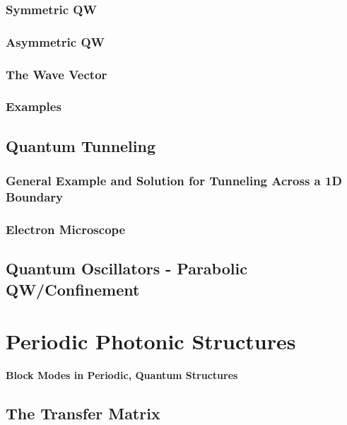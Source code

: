 \documentclass[colorlinks,11pt,a4paper,normalphoto,withhyper,ragged2e]{altareport}
\renewcommand{\ReportSectionFont}{\LARGE\rmfamily\bfseries} %
\begin{document}
		\subsubsection{Symmetric QW}
		
		
		\subsubsection{Asymmetric QW}
		
		
		\subsubsection{The Wave Vector}
		
		
		\subsubsection{Examples}
		
		
	\subsection{Quantum Tunneling}
	
		\subsubsection{General Example and Solution for Tunneling Across a 1D Boundary}
		
		
		\subsubsection{Electron Microscope}
		
		
	\subsection{Quantum Oscillators - Parabolic QW/Confinement}
	
	
	\pagebreak
	
	
	
	
\section{Periodic Photonic Structures}\vskip0pt
	{\quad\quad\color{heading}\ReportSectionFont{Block Modes in Periodic, Quantum Structures}}
		
	\subsection{The Transfer Matrix}
	
\end{document}
